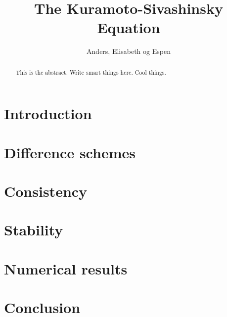 \documentclass[10pt,a4paper]{article}
\begin{document}
\title{The Kuramoto-Sivashinsky Equation}
\author{Anders, Elisabeth og Espen}
\maketitle

\begin{abstract}
This is the abstract. Write smart things here. Cool things.
\end{abstract}

\section{Introduction}


\section{Difference schemes}


\section{Consistency}


\section{Stability}


\section{Numerical results}


\section{Conclusion}

\end{document}
